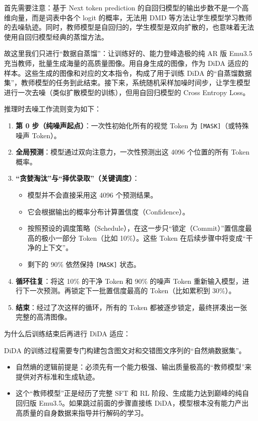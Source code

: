首先需要注意：基于 Next token prediction 的自回归模型的输出步数不是一个高维向量，而是词表中各个 logit 的概率，无法用 DMD 等方法让学生模型学习教师的去噪轨迹。同时，教师模型是自回归的，学生模型是双向扩散的，也意味着无法使用自回归模型经典的蒸馏方法。

故这里我们只进行``数据自蒸馏''：让训练好的、能力登峰造极的纯 AR 版 Emu3.5 充当教师，批量生成海量的高质量图像。用自身生成的图像，作为 DiDA 适应的样本。这些生成的图像和对应的文本指令，构成了用于训练 DiDA 的``自蒸馏数据集''，教师模型的任务到此结束。接下来，系统随机采样加噪时间步，让学生模型进行一次去噪（类似扩散模型的训练），但用自回归模型的 Cross Entropy Loss。

推理时去噪工作流则变为如下：

\begin{enumerate}
\def\labelenumi{\arabic{enumi}.}
\tightlist
\item
  \textbf{第 0 步（纯噪声起点）}：一次性初始化所有的视觉 Token 为 \texttt{{[}MASK{]}}（或特殊噪声 Token）。
\item
  \textbf{全局预测}：模型通过双向注意力，一次性预测出这 4096 个位置的所有 Token 概率。
\item
  \textbf{``贪婪淘汰''与``择优录取''（关键调度）}：

  \begin{itemize}
  \tightlist
  \item
    模型并不会直接采用这 4096 个预测结果。
  \item
    它会根据输出的概率分布计算置信度（Confidence）。
  \item
    按照预设的调度策略（Schedule），在这一步只``锁定（Commit）''置信度最高的极小一部分 Token（比如 10\%）。这些 Token 在后续步骤中将变成``干净的上下文''。
  \item
    剩下的 90\% 依然保持 \texttt{{[}MASK{]}} 状态。
  \end{itemize}
\item
  \textbf{循环往复}：将这 10\% 的干净 Token 和 90\% 的噪声 Token 重新输入模型，进行下一次预测。再锁定下一批置信度最高的 Token（比如累积到 30\%）。
\item
  \textbf{结束}：经过了次这样的循环，所有的 Token 都被逐步锁定，最终拼凑出一张完整的高清图像。
\end{enumerate}

为什么后训练结束后再进行 DiDA 适应：

DiDA 的训练过程需要专门构建包含图文对和交错图文序列的``自然熵数据集''。

\begin{itemize}
\tightlist
\item
  自然熵的逻辑前提是：必须先有一个能力极强、输出质量极高的``教师模型''来提供对齐标准和生成轨迹。
\item
  这个``教师模型''正是经历了完整 SFT 和 RL 阶段、生成能力达到巅峰的纯自回归版 Emu3.5。如果跳过前面的步骤直接练 DiDA，模型根本没有能力产出高质量的自身数据来指导并行解码的学习。
\end{itemize}


